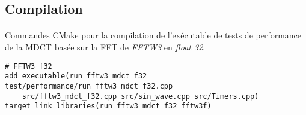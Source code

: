 \documentclass{article}
\begin{document}
\subsection{Compilation}\label{app:perf_mdct_fftw3_cmake}
\paragraph{}
Commandes CMake pour la compilation de l'exécutable de tests de performance de la MDCT basée sur la FFT de \emph{FFTW3} en \emph{float 32}.
\lstset{language=make}
\begin{lstlisting}
# FFTW3 f32
add_executable(run_fftw3_mdct_f32 test/performance/run_fftw3_mdct_f32.cpp
    src/fftw3_mdct_f32.cpp src/sin_wave.cpp src/Timers.cpp)
target_link_libraries(run_fftw3_mdct_f32 fftw3f)
\end{lstlisting}
\end{document}
